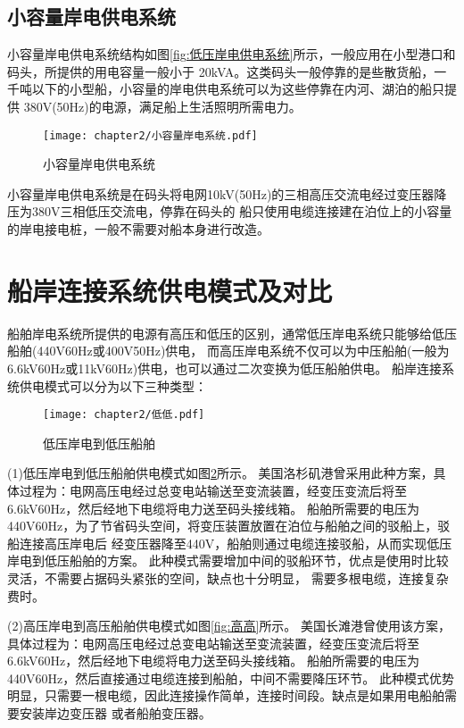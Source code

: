 \subsection{小容量岸电供电系统}

小容量岸电供电系统结构如图\ref{fig:低压岸电供电系统}所示，一般应用在小型港口和码头，所提供的用电容量一般小于
20kVA。这类码头一般停靠的是些散货船，一千吨以下的小型船，小容量的岸电供电系统可以为这些停靠在内河、湖泊的船只提供
380V(50Hz)的电源，满足船上生活照明所需电力。

\begin{figure}[!htp]
	\centering
	\texttt{[image: chapter2/小容量岸电系统.pdf]}
	\caption{小容量岸电供电系统}
	\label{fig:小容量岸电供电系统}
\end{figure}

小容量岸电供电系统是在码头将电网10kV(50Hz)的三相高压交流电经过变压器降压为380V三相低压交流电，停靠在码头的
船只使用电缆连接建在泊位上的小容量的岸电接电桩，一般不需要对船本身进行改造。

\section{船岸连接系统供电模式及对比}

船舶岸电系统所提供的电源有高压和低压的区别，通常低压岸电系统只能够给低压船舶(440V60Hz或400V50Hz)供电，
而高压岸电系统不仅可以为中压船舶(一般为6.6kV60Hz或11kV60Hz)供电，也可以通过二次变换为低压船舶供电。
船岸连接系统供电模式可以分为以下三种类型：

\begin{figure}[!htp]
	\centering
	\texttt{[image: chapter2/低低.pdf]}
	\caption{低压岸电到低压船舶}
	\label{fig:低低}
\end{figure}

(1)低压岸电到低压船舶供电模式如图\ref{fig:低低}所示。
美国洛杉矶港曾采用此种方案，具体过程为：电网高压电经过总变电站输送至变流装置，经变压变流后将至6.6kV60Hz，然后经地下电缆将电力送至码头接线箱。
船舶所需要的电压为440V60Hz，为了节省码头空间，将变压装置放置在泊位与船舶之间的驳船上，驳船连接高压岸电后
经变压器降至440V，船舶则通过电缆连接驳船，从而实现低压岸电到低压船舶的方案。
此种模式需要增加中间的驳船环节，优点是使用时比较灵活，不需要占据码头紧张的空间，缺点也十分明显，
需要多根电缆，连接复杂费时。

(2)高压岸电到高压船舶供电模式如图\ref{fig:高高}所示。
美国长滩港曾使用该方案，具体过程为：电网高压电经过总变电站输送至变流装置，经变压变流后将至6.6kV60Hz，然后经地下电缆将电力送至码头接线箱。
船舶所需要的电压为440V60Hz，然后直接通过电缆连接到船舶，中间不需要降压环节。
此种模式优势明显，只需要一根电缆，因此连接操作简单，连接时间段。缺点是如果用电船舶需要安装岸边变压器
或者船舶变压器。

